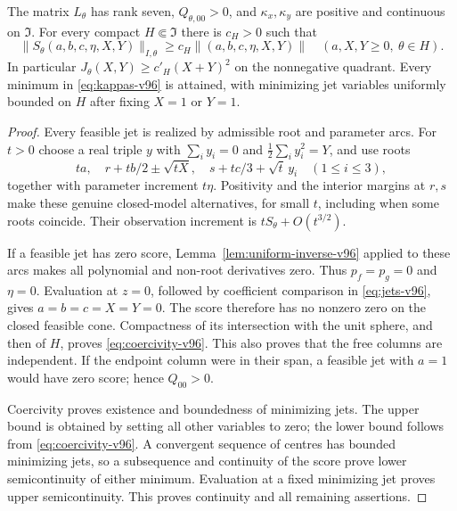\begin{lemma}\label{lem:coercive-v96}
The matrix $L_\theta$ has rank seven, $Q_{\theta,00}>0$, and
$\kappa_x,\kappa_y$ are positive and continuous on $\mathfrak I$.
For every compact $H\Subset\mathfrak I$ there is $c_H>0$ such that
\begin{equation}\label{eq:coercivity-v96}
 \|S_\theta(a,b,c,\eta,X,Y)\|_{I,\theta}
 \ge c_H\|(a,b,c,\eta,X,Y)\|
 \quad(a,X,Y\ge0,\ \theta\in H).
\end{equation}
In particular $J_\theta(X,Y)\ge c'_H(X+Y)^2$ on the nonnegative
quadrant. Every minimum in \eqref{eq:kappas-v96} is attained, with
minimizing jet variables uniformly bounded on $H$ after fixing $X=1$
or $Y=1$.
\end{lemma}
\begin{proof}
Every feasible jet is realized by admissible root and parameter arcs.
For $t>0$ choose a real triple $y$ with $\sum_i y_i=0$ and
$\frac12\sum_i y_i^2=Y$, and use roots
\begin{equation}\label{eq:arcs-v96}
 ta,\quad r+tb/2\pm\sqrt{tX},\quad
 s+tc/3+\sqrt t\,y_i\quad(1\le i\le3),
\end{equation}
together with parameter increment $t\eta$. Positivity and the interior
margins at $r,s$ make these genuine closed-model alternatives, for
small $t$, including when some roots coincide. Their observation
increment is $tS_\theta+O(t^{3/2})$.

If a feasible jet has zero score, Lemma~\ref{lem:uniform-inverse-v96}
applied to these arcs makes all polynomial and non-root derivatives
zero. Thus $p_f=p_g=0$ and $\eta=0$. Evaluation at $z=0$, followed by
coefficient comparison in \eqref{eq:jets-v96}, gives
$a=b=c=X=Y=0$. The score therefore has no nonzero zero on the closed
feasible cone. Compactness of its intersection with the unit sphere,
and then of $H$, proves \eqref{eq:coercivity-v96}.
This also proves that the free columns are independent. If the endpoint
column were in their span, a feasible jet with $a=1$ would have zero
score; hence $Q_{00}>0$.

Coercivity proves existence and boundedness of minimizing jets.
The upper bound is obtained by setting all other variables to zero;
the lower bound follows from \eqref{eq:coercivity-v96}. A convergent
sequence of centres has bounded minimizing jets, so a subsequence and
continuity of the score prove lower semicontinuity of either minimum.
Evaluation at a fixed minimizing jet proves upper semicontinuity.
This proves continuity and all remaining assertions.
\end{proof}

